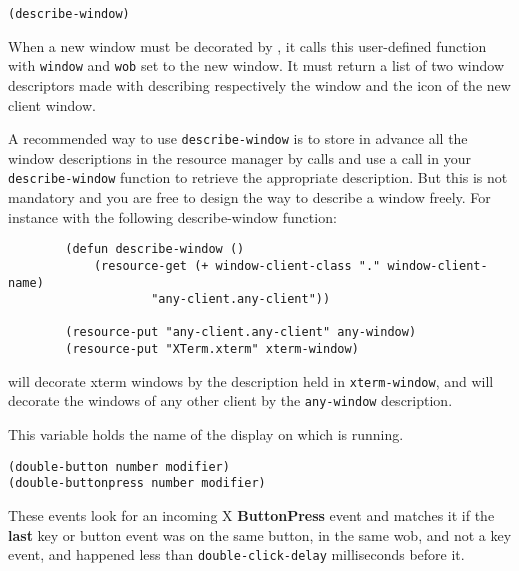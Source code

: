         
{\usagefont\begin{verbatim}
(describe-window)
\end{verbatim}}\usageupspace

When a new window must be decorated by {\GWM}, it calls this user-defined
function with \verb"window" and \verb"wob" set to the new window. It must
return a list of two window descriptors made with 
describing respectively the window and the icon of the new client window.

A recommended way to use \verb"describe-window"  is to store in advance all
the window descriptions in the resource manager by  calls
and use a  call in your \verb"describe-window" function to
retrieve the appropriate description. But this is not mandatory and you are
free to design the way to describe a window freely.  For instance with the
following describe-window function:

{\exemplefont\begin{verbatim}
        (defun describe-window ()
            (resource-get (+ window-client-class "." window-client-name)
                    "any-client.any-client"))

        (resource-put "any-client.any-client" any-window)
        (resource-put "XTerm.xterm" xterm-window)
\end{verbatim}}

{\GWM} will decorate xterm windows by the description held in
\verb"xterm-window", and will decorate the windows of any other client by
the \verb"any-window" description.

        

This variable holds the name of the display on which {\GWM} is running.

        
{\usagefont\begin{verbatim}
(double-button number modifier)
(double-buttonpress number modifier)
\end{verbatim}}\usageupspace

These events look for an incoming X {\bf ButtonPress} event and matches it
if the {\bf last} key or button event was on the same button, in the same
wob, and not a key event, and happened less than \verb"double-click-delay"
milliseconds before it.

